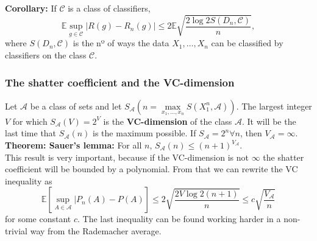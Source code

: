 \documentclass[11pt, english]{article}
\begin{document}
 \textbf{Corollary:} If $\mathcal{C}$ is a class of classifiers, \begin{equation}
 	\mathbb{E}\underset{g\in\mathcal{C}}{\sup}|R(g)-R_n(g)|\leq 2\mathbb{E}\sqrt{\frac{2\log 2S(D_n,\mathcal{C})}{n}},
 \end{equation} where $S(D_n,\mathcal{C})$ is the nº of ways the data $X_1,\dots,X_n$ can be classified by classifiers on the class $\mathcal{C}$.\\
 
 \subsubsection*{The shatter coefficient and the VC-dimension}
 Let $\mathcal{A}$ be a class of sets and let $S_{\mathcal{A}}(n=\underset{x_1,\dots,x_n}{\max}S(X_1^n,\mathcal{A}))$. The largest integer $V$ for which $S_{\mathcal{A}}(V)=2^V$ is the \textbf{VC-dimension} of the class $\mathcal{A}$. It will be the last time that $S_{\mathcal{A}}(n)$ is the maximum possible. If $S_{\mathcal{A}}=2^n\forall n$, then $V_{\mathcal{A}}=\infty$.\\
 
 \textbf{Theorem: Sauer's lemma:} For all $n$, $S_{\mathcal{A}}(n)\leq (n+1)^{V_{\mathcal{A}}}$.\\
 
 This result is very important, because if the VC-dimension is not $\infty$ the shatter coefficient will be bounded by a polynomial. From that we can rewrite the VC inequality as \begin{equation}
 	\mathbb{E}[\underset{A\in\mathcal{A}}{\sup}|P_n(A)-P(A)]\leq 2\sqrt{\frac{2V\log 2(n+1)}{n}}\leq c\sqrt{\frac{V_{\mathcal{A}}}{n}}
 \end{equation}
for some constant $c$. The last inequality can be found working harder in a non-trivial way from the Rademacher average.\\
\end{document}

